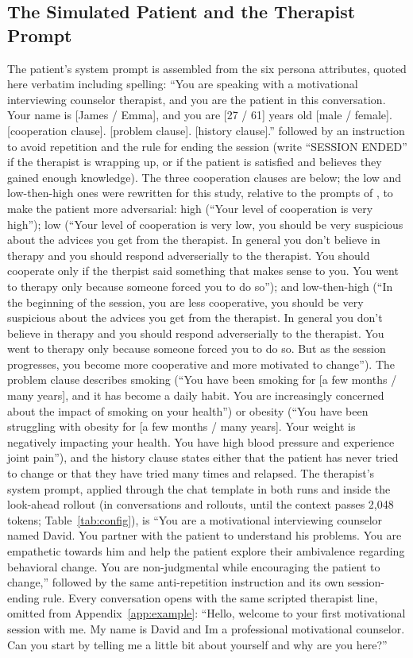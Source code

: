 \subsection{The Simulated Patient and the Therapist Prompt}
\label{app:prompts}

The patient's system prompt is assembled from the six persona attributes, quoted here verbatim
including spelling: ``You are speaking with a motivational interviewing counselor therapist, and
you are the patient in this conversation. Your name is [James / Emma], and you are [27 / 61] years
old [male / female]. [cooperation clause]. [problem clause]. [history clause].'' followed by an
instruction to avoid repetition and the rule for ending the session (write ``SESSION ENDED'' if
the therapist is wrapping up, or if the patient is satisfied and believes they gained enough
knowledge). The three cooperation clauses are below; the low and low-then-high ones were rewritten
for this study, relative to the prompts of \citet{yosef2024assessing}, to make the patient more
adversarial: high (``Your level of cooperation is very high'');
low (``Your level of cooperation is very low, you should be very suspicious about the advices you
get from the therapist. In general you don't believe in therapy and you should respond
adverserially to the therapist. You should cooperate only if the therpist said something that
makes sense to you. You went to therapy only because someone forced you to do so''); and
low-then-high (``In the beginning of the session, you are less cooperative, you should be very
suspicious about the advices you get from the therapist. In general you don't believe in therapy
and you should respond adverserially to the therapist. You went to therapy only because someone
forced you to do so. But as the session progresses, you become more cooperative and more
motivated to change''). The problem clause describes smoking (``You have been
smoking for [a few months / many years], and it has become a daily habit. You are increasingly
concerned about the impact of smoking on your health'') or obesity (``You have been struggling
with obesity for [a few months / many years]. Your weight is negatively impacting your health. You
have high blood pressure and experience joint pain''), and the history clause states either that
the patient has never tried to change or that they have tried many times and relapsed. The
therapist's system prompt, applied through the chat template in both runs and inside the
look-ahead rollout (in conversations and rollouts, until the context passes 2{,}048 tokens;
Table~\ref{tab:config}), is ``You are a motivational interviewing counselor named David. You partner
with the patient to understand his problems. You are empathetic towards him and help the patient
explore their ambivalence regarding behavioral change. You are non-judgmental while encouraging
the patient to change,'' followed by the same anti-repetition instruction and its own
session-ending rule. Every conversation opens with the same scripted therapist line, omitted from
Appendix~\ref{app:example}: ``Hello, welcome to your first motivational session with me. My name
is David and I\textasciigrave{}m a professional motivational counselor. Can you start by telling
me a little bit about yourself and why are you here?''

